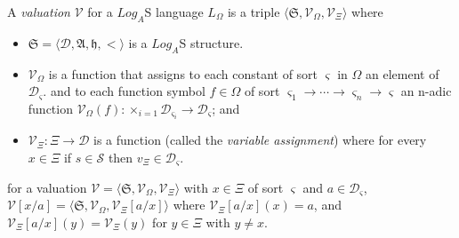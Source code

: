 \begin{defn}
	A \textit{valuation} $\mathcal{V}$ for a $Log_A$S language $L_{\Omega}$ is a triple $\langle \mathfrak{S}, \mathcal{V}_{\Omega}, \mathcal{V}_{\Xi} \rangle$ where
\end{defn}
\begin{itemize}
	\item $\mathfrak{S} = \langle \mathcal{D}, \mathfrak{A}, \mathfrak{h}, < \rangle$ is a $Log_A$S structure.
	\item $\mathcal{V}_{\Omega}$ is a function that assigns to each constant of sort $\varsigma$ in $\Omega$ an element of $\mathcal{D}_{\varsigma}$.
	      and to each function symbol $f \in \Omega$ of sort $\varsigma_1 \to \cdots \to \varsigma_n \to \varsigma$ an
	      n-adic function $\mathcal{V}_{\Omega}(f) :  \times_{i=1} \mathcal{D}_{\varsigma_i} \to \mathcal{D}_{\varsigma}$; and
	\item $\mathcal{V}_{\Xi} : \Xi \to \mathcal{D}$ is a function (called the \textit{variable assignment}) where
	      for every $x \in \Xi$ if $s \in \mathcal{S}$ then $v_{\Xi} \in \mathcal{D}_{\varsigma}$.
\end{itemize}

for a valuation $\mathcal{V} = \langle \mathfrak{S}, \mathcal{V}_{\Omega}, \mathcal{V}_{\Xi} \rangle$ with
$x \in \Xi$ of sort $\varsigma$ and $a \in \mathcal{D}_{\varsigma}$, $\mathcal{V}[x/a] = \langle \mathfrak{S}, \mathcal{V}_{\Omega}, \mathcal{V}_{\Xi}[a/x] \rangle$
where $\mathcal{V}_{\Xi}[a/x](x) = a$, and $\mathcal{V}_{\Xi}[a/x](y) = \mathcal{V}_{\Xi}(y)$ for $y \in \Xi$ with $y \neq x$.

